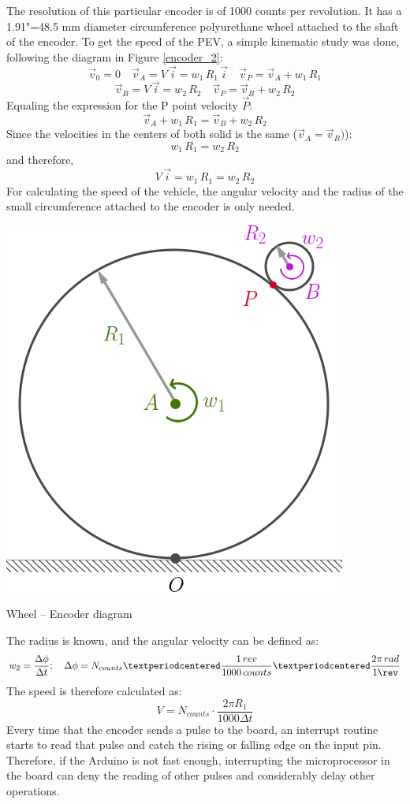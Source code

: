 The resolution of this particular encoder is of 1000 counts per revolution. It has a 1.91"=48.5 mm diameter circumference polyurethane wheel attached to the shaft of the encoder. To get the speed of the PEV, a simple kinematic study was done, following the diagram in Figure \ref{encoder_2}:
\[\vec{v}_{0}=0 \quad \vec{v}_{A}=V\,\vec{i}=w_{1}\,R_{1}\,\vec{i} \quad \vec{v}_{P}=\vec{v}_{A}+w_{1}\,R_{1}\]
\[\vec{v}_{B}=V\,\vec{i}=w_{2}\,R_{2} \quad \vec{v}_{P}=\vec{v}_{B}+w_{2}\,R_{2}\]
Equaling the expression for the P point velocity $\vec{P}$:  
\[\vec{v}_{A}+w_{1}\,R_{1}=\vec{v}_{B}+w_{2}\,R_{2}\]
Since the velocities in the centers of both solid is the same ($\vec{v}_{A}=\vec{v}_{B})$):
\[w_{1}\,R_{1}=w_{2}\,R_{2}\] and therefore, \[V\,\vec{i}=w_{1}\,R_{1}=w_{2}\,R_{2}\]
For calculating the speed of the vehicle, the angular velocity and the radius of the small circumference attached to the encoder is only needed.

\begin{marginfigure}[-5cm]
	\includegraphics[width=1.15\linewidth]{figs/05/encoder_2}
	\caption{Wheel -- Encoder diagram}
\end{marginfigure}

The radius is known, and the angular velocity can be defined as:
\[w_{2}=\frac{\Delta\phi}{\Delta t}; \quad \Delta\phi=N_{counts}·\frac{1\,rev}{1000\,counts}·\frac{2\pi\,rad}{1\rev}\]
The speed is therefore calculated as:
\[V=N_{counts}·\frac{2\pi R_{1}}{1000\Delta t}\]
Every time that the encoder sends a pulse to the board, an interrupt routine starts to read that pulse and catch the rising or falling edge on the input pin. Therefore, if the Arduino is not fast enough, interrupting the microprocessor in the board can deny the reading of other pulses and considerably delay other operations. 

